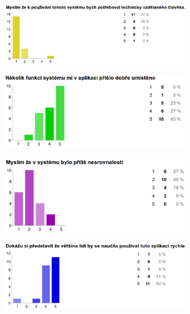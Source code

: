 \begin{figure}[H]
\begin{center}
\includegraphics[width=80mm]{./pictures/dotaznik/sus-04.png}
\label{fig:dot:sus-04}
\end{center}
\end{figure}

\begin{figure}[H]
\begin{center}
\includegraphics[width=80mm]{./pictures/dotaznik/sus-05.png}
\label{fig:dot:sus-05}
\end{center}
\end{figure}

\begin{figure}[H]
\begin{center}
\includegraphics[width=80mm]{./pictures/dotaznik/sus-06.png}
\label{fig:dot:sus-06}
\end{center}
\end{figure}

\begin{figure}[H]
\begin{center}
\includegraphics[width=80mm]{./pictures/dotaznik/sus-07.png}
\label{fig:dot:sus-07}
\end{center}
\end{figure}

